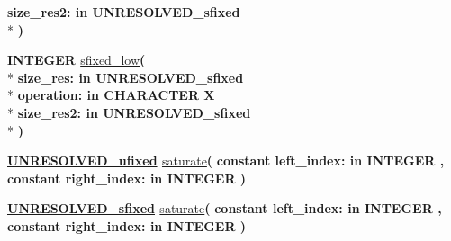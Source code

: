 \begin{DoxyCompactItemize}
{\bfseries \textcolor{vhdlchar}{size\+\_\+res2\+: }\textcolor{stringliteral}{in }\textcolor{vhdlchar}{U\+N\+R\+E\+S\+O\+L\+V\+E\+D\+\_\+sfixed}}\\*
{\bfseries  )} 
\item 
{\bfseries {\bfseries \textcolor{comment}{I\+N\+T\+E\+G\+E\+R}\textcolor{vhdlchar}{ }}} \hyperlink{classfixed__pkg_a5c29a132b64790ae25761495b4c72d13}{sfixed\+\_\+low}{\bfseries  ( }\\*
{\bfseries \textcolor{vhdlchar}{size\+\_\+res\+: }\textcolor{stringliteral}{in }\textcolor{vhdlchar}{U\+N\+R\+E\+S\+O\+L\+V\+E\+D\+\_\+sfixed}}\\*
{\bfseries \textcolor{vhdlchar}{operation\+: }\textcolor{stringliteral}{in }\textcolor{vhdlchar}{C\+H\+A\+R\+A\+C\+T\+E\+R   \textquotesingle{}\+X\textquotesingle{}}}\\*
{\bfseries \textcolor{vhdlchar}{size\+\_\+res2\+: }\textcolor{stringliteral}{in }\textcolor{vhdlchar}{U\+N\+R\+E\+S\+O\+L\+V\+E\+D\+\_\+sfixed}}\\*
{\bfseries  )} 
\item 
{\bfseries {\bfseries {\bfseries \hyperlink{classfixed__pkg_ae78bc2b36d22f6abeac163955e8a587d}{U\+N\+R\+E\+S\+O\+L\+V\+E\+D\+\_\+ufixed}} \textcolor{vhdlchar}{ }}} \hyperlink{classfixed__pkg_ad69f6265ecabea4646226a786cdf93e0}{saturate}{\bfseries  ( }{\bfseries {\bfseries \textcolor{keywordflow}{constant}\textcolor{vhdlchar}{ }}\textcolor{vhdlchar}{left\+\_\+index\+: }\textcolor{stringliteral}{in }{\bfseries \textcolor{comment}{I\+N\+T\+E\+G\+E\+R}\textcolor{vhdlchar}{ }}}{\bfseries  , {\bfseries \textcolor{keywordflow}{constant}\textcolor{vhdlchar}{ }}\textcolor{vhdlchar}{right\+\_\+index\+: }\textcolor{stringliteral}{in }{\bfseries \textcolor{comment}{I\+N\+T\+E\+G\+E\+R}\textcolor{vhdlchar}{ }}}{\bfseries  )} 
\item 
{\bfseries {\bfseries {\bfseries \hyperlink{classfixed__pkg_aa723b28a027c3c0f9bca02d75e8df4d6}{U\+N\+R\+E\+S\+O\+L\+V\+E\+D\+\_\+sfixed}} \textcolor{vhdlchar}{ }}} \hyperlink{classfixed__pkg_a53d2b082cd4171c5f98659bc00937b62}{saturate}{\bfseries  ( }{\bfseries {\bfseries \textcolor{keywordflow}{constant}\textcolor{vhdlchar}{ }}\textcolor{vhdlchar}{left\+\_\+index\+: }\textcolor{stringliteral}{in }{\bfseries \textcolor{comment}{I\+N\+T\+E\+G\+E\+R}\textcolor{vhdlchar}{ }}}{\bfseries  , {\bfseries \textcolor{keywordflow}{constant}\textcolor{vhdlchar}{ }}\textcolor{vhdlchar}{right\+\_\+index\+: }\textcolor{stringliteral}{in }{\bfseries \textcolor{comment}{I\+N\+T\+E\+G\+E\+R}\textcolor{vhdlchar}{ }}}{\bfseries  )} 

\end{DoxyCompactItemize}
